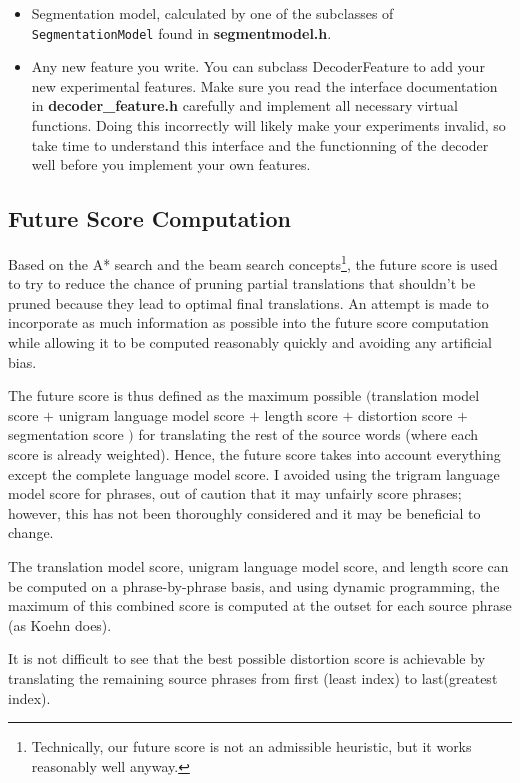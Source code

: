 \documentclass[12pt]{amsart} \usepackage{epsfig} \usepackage{rotating}
\newcommand{\file}{\textbf} \newcommand{\url}{\underline}
\newcommand{\code}{\small\texttt}
\begin{document}
\begin{itemize}
\item
Segmentation model, calculated by one of the subclasses of
\code{SegmentationModel} found in \file{segmentmodel.h}.

\item
Any new feature you write.  You can subclass DecoderFeature to add your new
experimental features.  Make sure you read the interface documentation in
\file{decoder\_feature.h} carefully and implement all necessary virtual
functions.  Doing this incorrectly will likely make your experiments invalid,
so take time to understand this interface and the functionning of the decoder
well before you implement your own features.

\end{itemize}

\subsection{Future Score Computation}

Based on the A* search and the beam search concepts\footnote{Technically, our
future score is not an admissible heuristic, but it works reasonably well
anyway.}, the future score is used to
try to reduce the chance of pruning partial translations that shouldn't be
pruned because they lead to optimal final translations.  An attempt is made to
incorporate as much information as possible into the future score computation
while allowing it to be computed reasonably quickly and avoiding any artificial
bias.

The future score is thus defined as the maximum possible $($translation model
score $+$ unigram language model score $+$ length score $+$ distortion score
$+$ segmentation score $)$
for translating the rest of the source words (where each score is already
weighted).  Hence, the future score takes into account everything except the
complete language model score.  I avoided using the trigram language model
score for phrases, out of caution that it may unfairly score phrases; however,
this has not been thoroughly considered and it may be beneficial to change.

The translation model score, unigram language model score, and length score can
be computed on a phrase-by-phrase basis, and using dynamic programming, the
maximum of this combined score is computed at the outset for each source phrase
(as Koehn does).

It is not difficult to see that the best possible distortion score is
achievable by translating the remaining source phrases from first (least index)
to last(greatest index).
\end{document}

